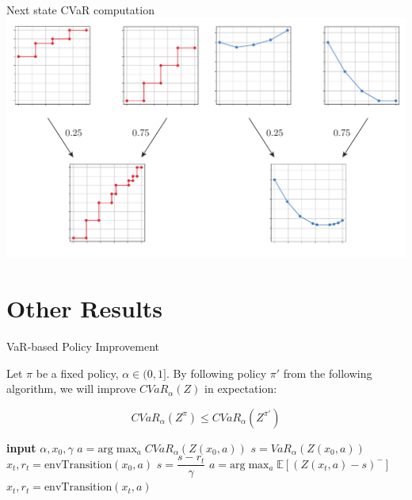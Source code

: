 \documentclass{beamer}
\begin{document}
\begin{frame}{Next state CVaR computation}
\center
\includegraphics[width=\linewidth]{../gfx/multivarvar.pdf}
\end{frame}

\section{Other Results}

\begin{frame}{VaR-based Policy Improvement}
\begin{theorem}
Let $\pi$ be a fixed policy, $\alpha \in (0, 1]$. By following policy $\pi'$ from the following algorithm, we will improve $CVaR_\alpha(Z)$ in expectation:

$$CVaR_\alpha(Z^\pi) \le CVaR_\alpha(Z^{\pi'})$$
\end{theorem}


\begin{algorithmic}
    \STATE \textbf{input} $\alpha, x_0, \gamma$
    \STATE $a = \text{arg}\max_a CVaR_\alpha(Z(x_0, a))$
    \STATE $s = VaR_\alpha(Z(x_0, a))$
    \STATE $x_t, r_t = \text{envTransition}(x_0, a)$
    	\STATE $s = \dfrac{s-r_t}{\gamma}$
    	\STATE $a = \text{arg}\max_a \mathbb{E}\left[(Z(x_t, a)-s)^- \right]$
    	\STATE $x_t, r_t = \text{envTransition}(x_t, a)$
   	\ENDWHILE
\end{algorithmic}

\end{frame}


%
%
%
\end{document}
